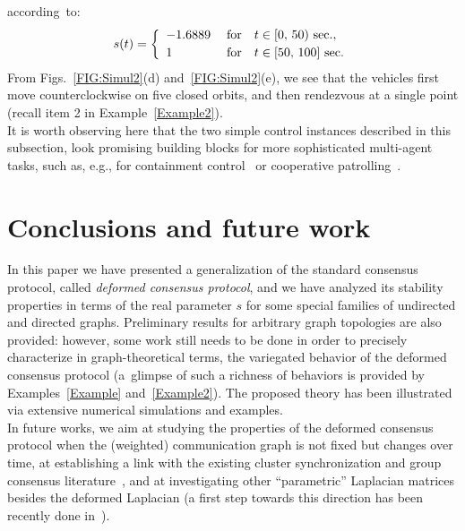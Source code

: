 \documentclass[letterpaper,9pt,twocolumn]{autart}
\begin{document}
\mbox{according to:}\vspace{-0.1cm} $$
s(t) = \left\{
\begin{array}{lll}
-1.6889\; &\text{for} & t \in [0,\, 50)~\text{sec}.,\vspace{0.08cm}\\
1\; &\text{for} & t \in [50,\, 100]~\text{sec}.
\end{array}
\right.
$$
From Figs.~\ref{FIG:Simul2}(d) and~\ref{FIG:Simul2}(e), we see
that the vehicles first move counterclockwise on five closed orbits, and then
rendezvous at a single point (recall item 2 in \mbox{Example~\ref{Example2}}).\\
It is worth observing here that the two simple control instances described in
this subsection, look promising building blocks for more sophisticated multi-agent 
tasks, such as, e.g., for containment control~\cite{JiFeEgBu_TAC08} or cooperative patrolling~\cite{PasqualettiFrBu_TRO12}.


\vspace{-0.25cm}
\section{Conclusions and future work}\label{Sect:concl}
\vspace{-0.25cm}
In this paper we have presented a generalization of the standard consensus protocol,
called \emph{deformed consensus protocol}, and we have analyzed its stability properties
in terms of the real parameter $s$ for some special families of undirected and directed graphs.
Preliminary results for arbitrary graph topologies are also provided: however, some work still needs
to be done in order to precisely characterize in graph-theoretical
terms, the variegated behavior of the deformed consensus protocol
(a~glimpse of such a richness of behaviors is provided
by Examples~\ref{Example} and~\ref{Example2}). The proposed theory has been illustrated
via \mbox{extensive} numerical simulations and examples.\vspace{0.05cm}\\
In future works, we aim at studying the properties of the deformed consensus protocol when the
(weighted) communication graph is not fixed but changes over time, 
at establishing a link with the existing cluster synchronization
and group consensus literature~\cite{YuWa_SCL10,XiaCa_AUTO11},
and at investigating other ``parametric'' Laplacian matrices besides
the deformed Laplacian (a first step towards this direction has 
been recently done in~\cite{Morbidi_TAC13}). 
 
\end{document}
